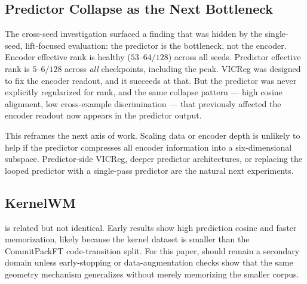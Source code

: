 \subsection{Predictor Collapse as the Next Bottleneck}

The cross-seed investigation surfaced a finding that was hidden by the
single-seed, lift-focused evaluation: the predictor is the bottleneck,
not the encoder.  Encoder effective rank is healthy ($53\text{--}64/128$)
across all seeds.  Predictor effective rank is $5\text{--}6/128$ across
\emph{all} checkpoints, including the peak.  VICReg was designed to fix
the encoder readout, and it succeeds at that.  But the predictor was
never explicitly regularized for rank, and the same collapse
pattern --- high cosine alignment, low cross-example discrimination ---
that previously affected the encoder readout now appears in the
predictor output.

This reframes the next axis of work.  Scaling data or encoder depth is
unlikely to help if the predictor compresses all encoder information into
a six-dimensional subspace.  Predictor-side VICReg, deeper predictor
architectures, or replacing the looped predictor with a single-pass
predictor are the natural next experiments.

\subsection{KernelWM}

\KernelWM{} is related but not identical.  Early results show high
prediction cosine and faster memorization, likely because the kernel
dataset is smaller than the CommitPackFT code-transition split.  For this
paper, \KernelWM{} should remain a secondary domain unless early-stopping
or data-augmentation checks show that the same geometry mechanism
generalizes without merely memorizing the smaller corpus.
